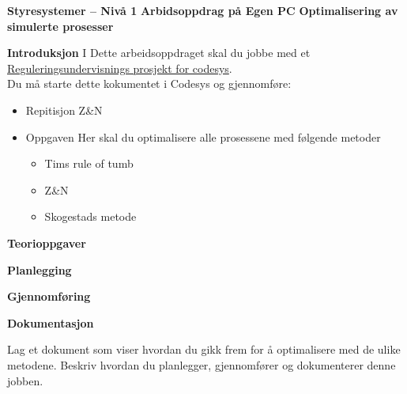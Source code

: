 

\noindent

\vskip 5pt

\vskip 5pt
\begin{center}
\textbf{Styresystemer -- Nivå 1 }
\vskip 5pt 
\textbf{Arbidsoppdrag på Egen PC}
\vskip 5pt 
	\textbf{Optimalisering av simulerte prosesser}
\end{center}

\textbf{Introduksjon}
I Dette arbeidsoppdraget  skal du jobbe med et \href{https://rfka-my.sharepoint.com/:u:/g/personal/fred-olav_mosdal_skole_rogfk_no/EdYP_MBtF1hIv2zqvzwtseMBLPwboQBdzCetAxSY83kwLw?e=PAZiw7}{Reguleringsundervisnings prosjekt for codesys}. \\

Du må starte dette kokumentet i Codesys og gjennomføre:
\begin{itemize}[noitemsep]
\item Repitisjon Z\&N
\item Oppgaven Her skal du optimalisere alle prosessene med følgende metoder
\begin{itemize}[noitemsep]
\item Tims rule of tumb
\item Z\&N
\item Skogestads metode
\end{itemize}


\end{itemize}


\vskip 10pt 
\textbf{Teorioppgaver}

\vskip 5pt 

\vskip 10pt 
\textbf{Planlegging}


\vskip 10pt 
\textbf{Gjennomføring}

\vskip 10pt 
\textbf{Dokumentasjon}

Lag et dokument som viser hvordan du gikk frem for å optimalisere med de ulike metodene. 
Beskriv hvordan du planlegger, gjennomfører og dokumenterer denne jobben. 


















\vfil \eject

















